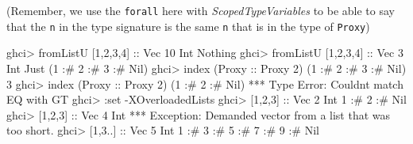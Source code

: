 \documentclass[]{article}
\newenvironment{Shaded}{}{}
\newcommand{\DataTypeTok}[1]{\textcolor[rgb]{0.56,0.13,0.00}{#1}}
\newcommand{\DecValTok}[1]{\textcolor[rgb]{0.25,0.63,0.44}{#1}}
\newcommand{\FunctionTok}[1]{\textcolor[rgb]{0.02,0.16,0.49}{#1}}
\newcommand{\NormalTok}[1]{#1}
\newcommand{\OperatorTok}[1]{\textcolor[rgb]{0.40,0.40,0.40}{#1}}
\newcommand{\OtherTok}[1]{\textcolor[rgb]{0.00,0.44,0.13}{#1}}
\begin{document}
(Remember, we use the \texttt{forall} here with \emph{ScopedTypeVariables} to be
able to say that the \texttt{n} in the type signature is the same \texttt{n}
that is in the type of \texttt{Proxy})

\begin{Shaded}
\begin{Highlighting}[]
\NormalTok{ghci}\OperatorTok{>}\NormalTok{ fromListU [}\DecValTok{1}\NormalTok{,}\DecValTok{2}\NormalTok{,}\DecValTok{3}\NormalTok{,}\DecValTok{4}\NormalTok{]}\OtherTok{ ::} \DataTypeTok{Vec} \DecValTok{10} \DataTypeTok{Int}
\DataTypeTok{Nothing}
\NormalTok{ghci}\OperatorTok{>}\NormalTok{ fromListU [}\DecValTok{1}\NormalTok{,}\DecValTok{2}\NormalTok{,}\DecValTok{3}\NormalTok{,}\DecValTok{4}\NormalTok{]}\OtherTok{ ::} \DataTypeTok{Vec} \DecValTok{3} \DataTypeTok{Int}
\DataTypeTok{Just}\NormalTok{ (}\DecValTok{1} \OperatorTok{:\#} \DecValTok{2} \OperatorTok{:\#} \DecValTok{3} \OperatorTok{:\#} \DataTypeTok{Nil}\NormalTok{)}
\NormalTok{ghci}\OperatorTok{>} \FunctionTok{index}\NormalTok{ (}\DataTypeTok{Proxy}\OtherTok{ ::} \DataTypeTok{Proxy} \DecValTok{2}\NormalTok{) (}\DecValTok{1} \OperatorTok{:\#} \DecValTok{2} \OperatorTok{:\#} \DecValTok{3} \OperatorTok{:\#} \DataTypeTok{Nil}\NormalTok{)}
\DecValTok{3}
\NormalTok{ghci}\OperatorTok{>} \FunctionTok{index}\NormalTok{ (}\DataTypeTok{Proxy}\OtherTok{ ::} \DataTypeTok{Proxy} \DecValTok{2}\NormalTok{) (}\DecValTok{1} \OperatorTok{:\#} \DecValTok{2} \OperatorTok{:\#} \DataTypeTok{Nil}\NormalTok{)}
\OperatorTok{***} \DataTypeTok{Type} \DataTypeTok{Error}\OperatorTok{:} \DataTypeTok{Couldn\textquotesingle{}t}\NormalTok{ match }\DataTypeTok{\textquotesingle{}EQ}\NormalTok{ with }\DataTypeTok{\textquotesingle{}GT}
\NormalTok{ghci}\OperatorTok{>} \OperatorTok{:}\NormalTok{set }\OperatorTok{{-}}\DataTypeTok{XOverloadedLists}
\NormalTok{ghci}\OperatorTok{>}\NormalTok{ [}\DecValTok{1}\NormalTok{,}\DecValTok{2}\NormalTok{,}\DecValTok{3}\NormalTok{]}\OtherTok{ ::} \DataTypeTok{Vec} \DecValTok{2} \DataTypeTok{Int}
\DecValTok{1} \OperatorTok{:\#} \DecValTok{2} \OperatorTok{:\#} \DataTypeTok{Nil}
\NormalTok{ghci}\OperatorTok{>}\NormalTok{ [}\DecValTok{1}\NormalTok{,}\DecValTok{2}\NormalTok{,}\DecValTok{3}\NormalTok{]}\OtherTok{ ::} \DataTypeTok{Vec} \DecValTok{4} \DataTypeTok{Int}
\OperatorTok{***} \DataTypeTok{Exception}\OperatorTok{:} \DataTypeTok{Demanded}\NormalTok{ vector from a list that was too short}\OperatorTok{.}
\NormalTok{ghci}\OperatorTok{>}\NormalTok{ [}\DecValTok{1}\NormalTok{,}\DecValTok{3}\OperatorTok{..}\NormalTok{]}\OtherTok{ ::} \DataTypeTok{Vec} \DecValTok{5} \DataTypeTok{Int}
\DecValTok{1} \OperatorTok{:\#} \DecValTok{3} \OperatorTok{:\#} \DecValTok{5} \OperatorTok{:\#} \DecValTok{7} \OperatorTok{:\#} \DecValTok{9} \OperatorTok{:\#} \DataTypeTok{Nil}
\end{Highlighting}
\end{Shaded}
\end{document}
